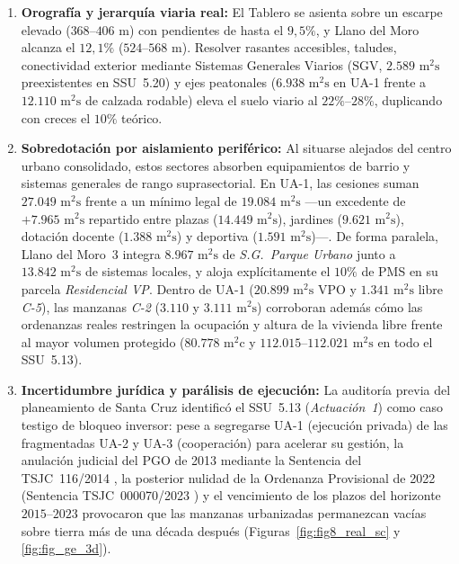 \begin{enumerate}
  \item \textbf{Orografía y jerarquía viaria real:} El Tablero se asienta sobre un escarpe elevado ($368$--$406\text{ m}$) con pendientes de hasta el $9{,}5\%$, y Llano del Moro alcanza el $12{,}1\%$ ($524$--$568\text{ m}$). Resolver rasantes accesibles, taludes, conectividad exterior mediante Sistemas Generales Viarios ($\text{SGV}$, $2.589\text{ m}^2\text{s}$ preexistentes en SSU~5.20) y ejes peatonales ($6.938\text{ m}^2\text{s}$ en UA-1 frente a $12.110\text{ m}^2\text{s}$ de calzada rodable) eleva el suelo viario al $22\%$--$28\%$, duplicando con creces el $10\%$ teórico.
  \item \textbf{Sobredotación por aislamiento periférico:} Al situarse alejados del centro urbano consolidado, estos sectores absorben equipamientos de barrio y sistemas generales de rango suprasectorial. En UA-1, las cesiones suman $27.049\text{ m}^2\text{s}$ frente a un mínimo legal de $19.084\text{ m}^2\text{s}$ ---un excedente de \textbf{$+7.965\text{ m}^2\text{s}$} repartido entre plazas ($14.449\text{ m}^2\text{s}$), jardines ($9.621\text{ m}^2\text{s}$), dotación docente ($1.388\text{ m}^2\text{s}$) y deportiva ($1.591\text{ m}^2\text{s}$)---. De forma paralela, Llano del Moro~3 integra $8.967\text{ m}^2\text{s}$ de \textit{S.G.~Parque Urbano} junto a $13.842\text{ m}^2\text{s}$ de sistemas locales, y aloja explícitamente el $10\%$ de PMS en su parcela \textit{Residencial VP}. Dentro de UA-1 ($20.899\text{ m}^2\text{s}$ VPO y $1.341\text{ m}^2\text{s}$ libre \textit{C-5}), las manzanas \textit{C-2} ($3.110$ y $3.111\text{ m}^2\text{s}$) corroboran además cómo las ordenanzas reales restringen la ocupación y altura de la vivienda libre frente al mayor volumen protegido ($80.778\text{ m}^2\text{c}$ y $112.015$--$112.021\text{ m}^2\text{s}$ en todo el SSU~5.13).
  \item \textbf{Incertidumbre jurídica y parálisis de ejecución:} La auditoría previa del planeamiento de Santa Cruz identificó el SSU~5.13 (\textit{Actuación~1}) como caso testigo de bloqueo inversor: pese a segregarse UA-1 (ejecución privada) de las fragmentadas UA-2 y UA-3 (cooperación) para acelerar su gestión, la anulación judicial del PGO de 2013 mediante la Sentencia del TSJC~116/2014 \cite{tsjc_116_2014}, la posterior nulidad de la Ordenanza Provisional de 2022 (Sentencia TSJC~000070/2023 \cite{tsjc_070_2023}) y el vencimiento de los plazos del horizonte $2015$--$2023$ provocaron que las manzanas urbanizadas permanezcan vacías sobre tierra más de una década después (Figuras~\ref{fig:fig8_real_sc} y \ref{fig:fig_ge_3d}).
\end{enumerate}

